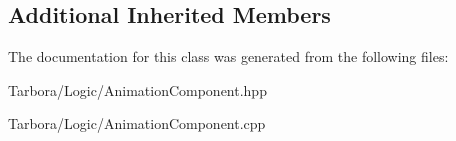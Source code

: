 \subsection*{Additional Inherited Members}


The documentation for this class was generated from the following files\+:\begin{DoxyCompactItemize}
\item 
Tarbora/\+Logic/Animation\+Component.\+hpp\item 
Tarbora/\+Logic/Animation\+Component.\+cpp\end{DoxyCompactItemize}
